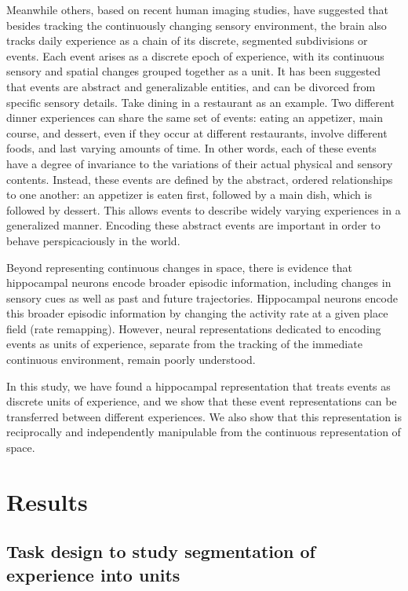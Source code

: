 Meanwhile others, based on recent human imaging studies\cite{sun2020}, have suggested that besides tracking the continuously changing sensory environment, the brain also tracks daily experience as a chain of its discrete, segmented subdivisions or events. Each event arises as a discrete epoch of experience, with its continuous sensory and spatial changes grouped together as a unit. It has been suggested that events are abstract and generalizable entities, and can be divorced from specific sensory details. Take dining in a restaurant as an example. Two different dinner experiences can share the same set of events: eating an appetizer, main course, and dessert, even if they occur at different restaurants, involve different foods, and last varying amounts of time. In other words, each of these events have a degree of invariance to the variations of their actual physical and sensory contents. Instead, these events are defined by the abstract, ordered relationships to one another: an appetizer is eaten first, followed by a main dish, which is followed by dessert. This allows events to describe widely varying experiences in a generalized manner. Encoding these abstract events are important in order to behave perspicaciously in the world.

Beyond representing continuous changes in space, there is evidence that hippocampal neurons encode broader episodic information, including changes in sensory cues as well as past and future trajectories. Hippocampal neurons encode this broader episodic information by changing the activity rate at a given place field (rate remapping). However, neural representations dedicated to encoding events as units of experience, separate from the tracking of the immediate continuous environment, remain poorly understood.

In this study, we have found a hippocampal representation that treats events as discrete units of experience, and we show that these event representations can be transferred between different experiences. We also show that this representation is reciprocally and independently manipulable from the continuous representation of space.

\section{Results}

\subsection{Task design to study segmentation of experience into units}

